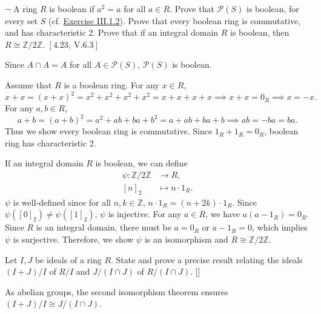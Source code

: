 \documentclass[12pt,letterpaper,boxed]{hmcpset}
\begin{document}
\hypertarget{Exercise III.3.15}{}
\begin{problem}[3.15]
	$\neg$ A ring $R$ is boolean if $a^{2}=a$ for all $a \in R$. Prove that $\mathscr{P}(S)$ is boolean, for every set $S$ (cf. \hyperlink{Exercise III.1.2}{Exercise III.1.2}). Prove that every boolean ring is commutative, and has characteristic 2. Prove that if an integral domain $R$ is boolean, then $R \cong \mathbb{Z} / 2 \mathbb{Z}$. $[4.23, \mathrm{~V}.6.3]$
\end{problem}
\begin{solution}
Since $A\cap A=A$ for all $A\in \mathscr{P}(S)$, $\mathscr{P}(S)$ is boolean.

Assume that $R$ is a boolean ring. For any $x\in R$,
\[
x+x=(x+x)^2=x^2+x^2+x^2+x^2=x+x+x+x\implies x+x=0_R\implies x=-x.
\]
For any $a,b\in R$,
\[
a+b=(a+b)^2=a^2+ab+ba+b^2=a+ab+ba+b\implies ab=-ba=ba.
\]
Thus we show every boolean ring is commutative. Since $1_R+1_R=0_R$, boolean ring has characteristic 2.

If an integral domain $R$ is boolean, we can define 
\begin{align*}
	\psi:\mathbb{Z} / 2 \mathbb{Z}&\longrightarrow R ,\\
	[n]_2 &\longmapsto n\cdot1_R.
\end{align*}
$\psi$ is well-defined since for all $n,k\in\mathbb{Z}$, $n\cdot1_R=(n+2k)\cdot1_R$. Since $\psi([0]_2)\ne\psi([1]_2)$, $\psi$ is injective. For any $a\in R$, we have $a(a-1_R)=0_R$. Since $R$ is an integral domain, there must be $a=0_R$ or $a-1_R=0$, which implies $\psi$ is surjective. Therefore, we show $\psi$ is an isomorphism and $R \cong \mathbb{Z} / 2 \mathbb{Z}$.
\end{solution}

\begin{problem}[3.17]
Let $I, J$ be ideals of a ring $R$. State and prove a precise result relating the ideals $(I + J)/I$ of $R/I$ and $J/(I \cap J)$ of $R/(I \cap J)$. []
\end{problem}
\begin{solution}
As abelian groups, the second isomorphism theorem ensures $(I + J)/I\cong J/(I \cap J)$.
\end{solution}
\end{document}
